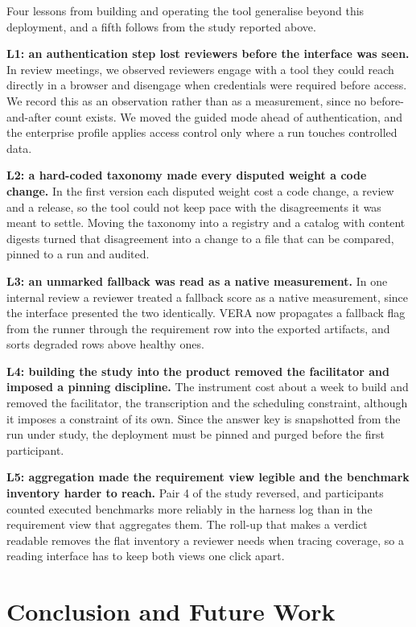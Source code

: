 \documentclass[10pt,conference]{IEEEtran}
\begin{document}
Four lessons from building and operating the tool generalise beyond this deployment, and a fifth follows from the study reported above.

\textbf{L1: an authentication step lost reviewers before the interface was seen.}
In review meetings, we observed reviewers engage with a tool they could reach directly in a browser and disengage when credentials were required before access.
We record this as an observation rather than as a measurement, since no before-and-after count exists.
We moved the guided mode ahead of authentication, and the enterprise profile applies access control only where a run touches controlled data.

\textbf{L2: a hard-coded taxonomy made every disputed weight a code change.}
In the first version each disputed weight cost a code change, a review and a release, so the tool could not keep pace with the disagreements it was meant to settle.
Moving the taxonomy into a registry and a catalog with content digests turned that disagreement into a change to a file that can be compared, pinned to a run and audited.

\textbf{L3: an unmarked fallback was read as a native measurement.}
In one internal review a reviewer treated a fallback score as a native measurement, since the interface presented the two identically.
VERA now propagates a fallback flag from the runner through the requirement row into the exported artifacts, and sorts degraded rows above healthy ones.

\textbf{L4: building the study into the product removed the facilitator and imposed a pinning discipline.}
The instrument cost about a week to build and removed the facilitator, the transcription and the scheduling constraint, although it imposes a constraint of its own.
Since the answer key is snapshotted from the run under study, the deployment must be pinned and purged before the first participant.

\textbf{L5: aggregation made the requirement view legible and the benchmark inventory harder to reach.}
Pair 4 of the study reversed, and participants counted executed benchmarks more reliably in the harness log than in the requirement view that aggregates them.
The roll-up that makes a verdict readable removes the flat inventory a reviewer needs when tracing coverage, so a reading interface has to keep both views one click apart.


\section{Conclusion and Future Work}
\label{sec:conclusion}
\end{document}
